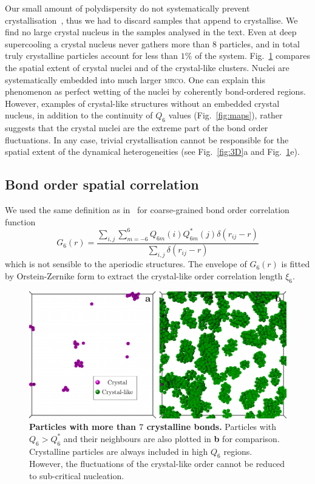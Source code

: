 Our small amount of polydispersity do not systematically prevent crystallisation~\cite{Zaccarelli2009}, thus we had to discard samples that append to crystallise. We find no large crystal nucleus in the samples analysed in the text. Even at deep supercooling a crystal nucleus never gathers more than 8 particles, and in total truly crystalline particles account for less than $1\%$ of the system. Fig.~\ref{fig:X_3D} compares the spatial extent of crystal nuclei and of the crystal-like clusters. Nuclei are systematically embedded into much larger \textsc{mrco}. One can explain this phenomenon as perfect wetting of the nuclei by coherently bond-ordered regions. However, examples of crystal-like structures without an embedded crystal nucleus, in addition to the continuity of $Q_6$ values (Fig.~\ref{fig:maps}), rather suggests that the crystal nuclei are the extreme part of the bond order fluctuations. In any case, trivial crystallisation cannot be responsible for the spatial extent of the dynamical heterogeneities (see Fig.~\ref{fig:3D}a and Fig.~\ref{fig:X_3D}e).

\subsection*{Bond order spatial correlation}

We used the same definition as in~\cite{tanaka2010critical} for coarse-grained bond order correlation function
\begin{equation}
	G_6(r) = \frac{\sum_{i,j} \sum_{m=-6}^{6} Q_{6 m}(i) Q_{6 m}^{*}(j) \delta(r_{ij}-r)}{\sum_{i,j} \delta(r_{ij}-r)}
	\label{eq:G_6}
\end{equation}
which is not sensible to the aperiodic structures. The envelope of $G_6(r)$ is fitted by Orstein-Zernike form to extract the crystal-like order correlation length $\xi_6$.

\clearpage

\begin{figure}
\begin{center}
\includegraphics{generate_figures-figure4.pdf}
\end{center}
\caption{\textbf{Particles with more than $7$ crystalline bonds.} Particles with $Q_6>Q_6^*$ and their neighbours are also plotted in \textbf{b} for comparison. Crystalline particles are always included in high $Q_6$ regions. However, the fluctuations of the crystal-like order cannot be reduced to sub-critical nucleation.}
	\label{fig:X_3D}
\end{figure}

